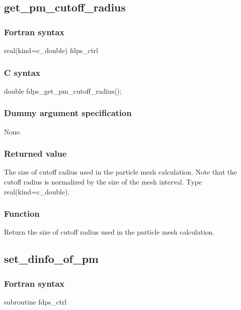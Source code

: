\subsection{get\_pm\_cutoff\_radius}
\subsubsection*{Fortran syntax}
\begin{screen}
\begin{spverbatim}
real(kind=c_double) fdps_ctrl%
\end{spverbatim}
\end{screen}

\subsubsection*{C syntax}
\begin{screen}
\begin{spverbatim}
double fdps_get_pm_cutoff_radius();
\end{spverbatim}
\end{screen}

\subsubsection*{Dummy argument specification}
None.

\subsubsection*{Returned value}
The size of cutoff radius used in the particle mesh calculation. Note that the cutoff radius is normalized by the size of the mesh interval. Type real(kind=c\_double).

\subsubsection*{Function}
Return the size of cutoff radius used in the particle mesh calculation.
\clearpage

\subsection{set\_dinfo\_of\_pm}
\subsubsection*{Fortran syntax}
\begin{screen}
\begin{spverbatim}
subroutine fdps_ctrl%
\end{spverbatim}
\end{screen}

